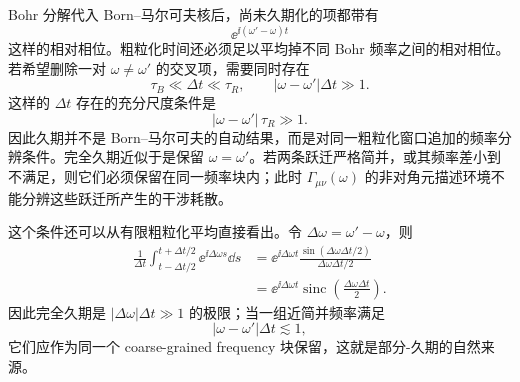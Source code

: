 Bohr 分解代入 Born--马尔可夫核后，尚未久期化的项都带有
\[
\ee^{\ii(\omega'-\omega)t}
\]
这样的相对相位。粗粒化时间还必须足以平均掉不同 Bohr 频率之间的相对相位。若希望删除一对 $\omega\neq\omega'$ 的交叉项，需要同时存在
\[
\tau_B\ll\Delta t\ll\tau_R,
\qquad
|\omega-\omega'|\Delta t\gg1.
\]
这样的 $\Delta t$ 存在的充分尺度条件是
\begin{equation}
|\omega-\omega'|\,\tau_R\gg1.
\label{eq:phys-oqs-secular-condition}
\end{equation}
因此久期并不是 Born--马尔可夫的自动结果，而是对同一粗粒化窗口追加的频率分辨条件。完全久期近似于是保留 $\omega=\omega'$。若两条跃迁严格简并，或其频率差小到不满足，则它们必须保留在同一频率块内；此时 $\Gamma_{\mu\nu}(\omega)$ 的非对角元描述环境不能分辨这些跃迁所产生的干涉耗散。

这个条件还可以从有限粗粒化平均直接看出。令
\(\Delta\omega=\omega'-\omega\)，则
\begin{align}
\frac1{\Delta t}
\int_{t-\Delta t/2}^{t+\Delta t/2}
\ee^{\ii\Delta\omega s}\dd s
&=
\ee^{\ii\Delta\omega t}
\frac{
\sin(\Delta\omega\Delta t/2)
}{
\Delta\omega\Delta t/2
}
\nonumber\\
&=
\ee^{\ii\Delta\omega t}
\operatorname{sinc}
\!\left(
\frac{\Delta\omega\Delta t}{2}
\right).
\label{eq:phys-oqs-finite-coarse-grain-sinc}
\end{align}
因此完全久期是
\(|\Delta\omega|\Delta t\gg1\) 的极限；当一组近简并频率满足
\[
|\omega-\omega'|\Delta t\lesssim1,
\]
它们应作为同一个 coarse-grained frequency 块保留，这就是部分-久期的自然来源。

